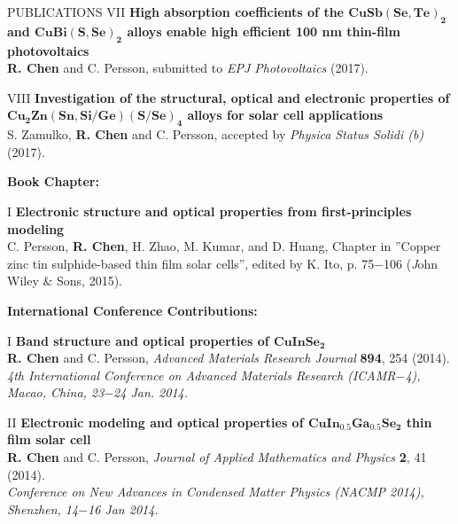 \documentclass{resume} %
\begin{document}
\begin{rSection}{PUBLICATIONS}
VII \textbf{High absorption coefficients of the $\mathbf {CuSb(Se,Te)_2}$ and $\mathbf {CuBi(S,Se)_2}$ alloys enable high efficient 100 nm thin-film photovoltaics}
\\ \textbf{R. Chen} and C. Persson, submitted to \textit{EPJ Photovoltaics} (2017).

VIII \textbf{Investigation of the structural, optical and electronic properties of $\mathbf{Cu_2}\mathbf{Zn(Sn,Si/Ge)}\mathbf{(S/Se)_4}$ alloys for solar cell applications}
\\ S. Zamulko, \textbf{R. Chen} and C. Persson, accepted by \textit{Physica Status Solidi (b)} (2017).




\textbf{Book Chapter:}

I \textbf{Electronic structure and optical properties from first-principles modeling} \\
C. Persson, \textbf{R. Chen}, H. Zhao, M. Kumar, and D. Huang, Chapter in ''Copper zinc tin sulphide-based thin film solar cells'',
edited by K. Ito, p. 75$-$106 ({\textit John Wiley $\&$ Sons}, 2015).



\textbf{International Conference Contributions:}




I \textbf{Band structure and optical properties of $\mathbf {CuInSe_2}$}
\\ \textbf{R. Chen} and C. Persson,
\textit{Advanced Materials Research Journal} {\textbf {894}}, 254 (2014). \\
\textit{4th International Conference on Advanced Materials Research (ICAMR$-$4), Macao, China, 23$-$24 Jan. 2014.}

II \textbf{Electronic modeling and optical properties of $\mathbf {CuIn_{0.5}Ga_{0.5}Se_2}$ thin film solar cell}
\\ \textbf{R. Chen} and C. Persson,
\textit{Journal of Applied Mathematics and Physics} {\textbf 2}, 41 (2014). \\
\textit{Conference on New Advances in Condensed Matter Physics (NACMP 2014), Shenzhen, 14$-$16 Jan 2014.}





\end{rSection}
\end{document}
